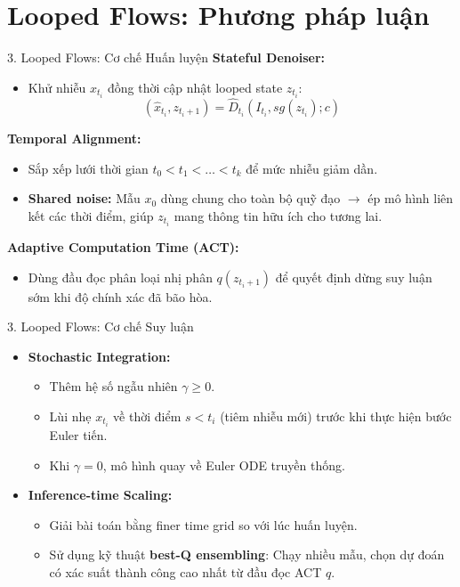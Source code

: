 \section{Looped Flows: Phương pháp luận}
\begin{frame}{3. Looped Flows: Cơ chế Huấn luyện}
    \textbf{Stateful Denoiser:}
    \begin{itemize}
        \item Khử nhiễu $x_{t_i}$ đồng thời cập nhật looped state $z_{t_i}$:
        $$(\hat{x}_{t_i}, z_{t_i+1}) = \hat{D}_{t_i}(I_{t_i}, sg(z_{t_i}); c)$$
    \end{itemize}
    
    \textbf{Temporal Alignment:}
    \begin{itemize}
        \item Sắp xếp lưới thời gian $t_0 < t_1 < \dots < t_k$ để mức nhiễu giảm dần.
        \item \textbf{Shared noise:} Mẫu $x_0$ dùng chung cho toàn bộ quỹ đạo $\rightarrow$ ép mô hình liên kết các thời điểm, giúp $z_{t_i}$ mang thông tin hữu ích cho tương lai.
    \end{itemize}
    
    \textbf{Adaptive Computation Time (ACT):}
    \begin{itemize}
        \item Dùng đầu đọc phân loại nhị phân $q(z_{t_i+1})$ để quyết định dừng suy luận sớm khi độ chính xác đã bão hòa.
    \end{itemize}
\end{frame}

\begin{frame}{3. Looped Flows: Cơ chế Suy luận}
    \begin{itemize}
        \item \textbf{Stochastic Integration:} 
        \begin{itemize}
            \item Thêm hệ số ngẫu nhiên $\gamma \ge 0$.
            \item Lùi nhẹ $x_{t_i}$ về thời điểm $s < t_i$ (tiêm nhiễu mới) trước khi thực hiện bước Euler tiến. 
            \item Khi $\gamma = 0$, mô hình quay về Euler ODE truyền thống.
        \end{itemize}
        \item \textbf{Inference-time Scaling:}
        \begin{itemize}
            \item Giải bài toán bằng finer time grid so với lúc huấn luyện.
            \item Sử dụng kỹ thuật \textbf{best-Q ensembling}: Chạy nhiều mẫu, chọn dự đoán có xác suất thành công cao nhất từ đầu đọc ACT $q$.
        \end{itemize}
    \end{itemize}
\end{frame}

